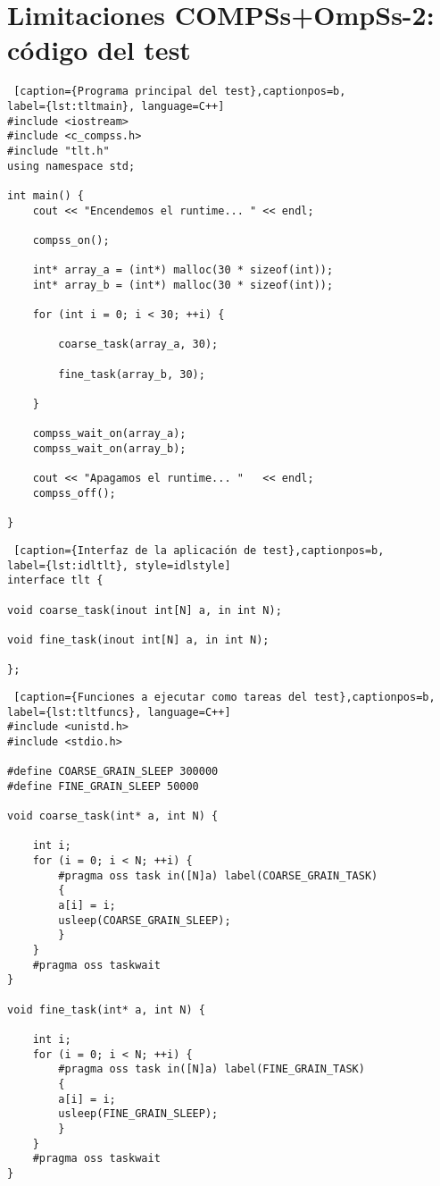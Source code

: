 \section{Limitaciones COMPSs+OmpSs-2: código del test}
\label{appendix:estudioprevio}

\begin{minipage}{\linewidth}
\begin{lstlisting} [caption={Programa principal del test},captionpos=b, 
label={lst:tltmain}, language=C++]
#include <iostream>
#include <c_compss.h>
#include "tlt.h"
using namespace std;

int main() {
	cout << "Encendemos el runtime... " << endl;

	compss_on();
	
	int* array_a = (int*) malloc(30 * sizeof(int));
	int* array_b = (int*) malloc(30 * sizeof(int));
	
	for (int i = 0; i < 30; ++i) {
	
		coarse_task(array_a, 30);
		
		fine_task(array_b, 30);
	
	}
	
	compss_wait_on(array_a);
	compss_wait_on(array_b);   
		
	cout << "Apagamos el runtime... "   << endl;
	compss_off();

}   
\end{lstlisting}
\end{minipage}

\begin{minipage}{\linewidth}
\begin{lstlisting} [caption={Interfaz de la aplicación de test},captionpos=b, 
label={lst:idltlt}, style=idlstyle] 
interface tlt {

void coarse_task(inout int[N] a, in int N);

void fine_task(inout int[N] a, in int N);

};
\end{lstlisting}
\end{minipage}

\newpage

\begin{minipage}{\linewidth}
\begin{lstlisting} [caption={Funciones a ejecutar como tareas del test},captionpos=b,
label={lst:tltfuncs}, language=C++] 
#include <unistd.h>
#include <stdio.h>

#define COARSE_GRAIN_SLEEP 300000
#define FINE_GRAIN_SLEEP 50000

void coarse_task(int* a, int N) {
	
	int i;
	for (i = 0; i < N; ++i) {
		#pragma oss task in([N]a) label(COARSE_GRAIN_TASK) 
		{
		a[i] = i;
		usleep(COARSE_GRAIN_SLEEP);
		}
	}
	#pragma oss taskwait
}

void fine_task(int* a, int N) {
	
	int i;
	for (i = 0; i < N; ++i) {
		#pragma oss task in([N]a) label(FINE_GRAIN_TASK)
		{
		a[i] = i;
		usleep(FINE_GRAIN_SLEEP);
		}
	} 
	#pragma oss taskwait
}  
\end{lstlisting}
\end{minipage}